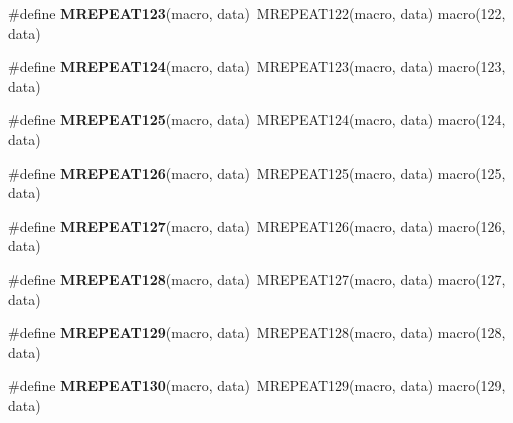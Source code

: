 \begin{DoxyCompactItemize}
\item 
\hypertarget{group__group__xmega__utils__mrepeat_gaf0802f3653fa2845f482ec6a119d9260}{\#define {\bfseries M\-R\-E\-P\-E\-A\-T123}(macro, data)~M\-R\-E\-P\-E\-A\-T122(macro, data)   macro(122, data)}\label{group__group__xmega__utils__mrepeat_gaf0802f3653fa2845f482ec6a119d9260}

\item 
\hypertarget{group__group__xmega__utils__mrepeat_gaffd8596b4b1da63e7fa64cdeb5c91dd0}{\#define {\bfseries M\-R\-E\-P\-E\-A\-T124}(macro, data)~M\-R\-E\-P\-E\-A\-T123(macro, data)   macro(123, data)}\label{group__group__xmega__utils__mrepeat_gaffd8596b4b1da63e7fa64cdeb5c91dd0}

\item 
\hypertarget{group__group__xmega__utils__mrepeat_ga7396c439515bd5514d070147e165690a}{\#define {\bfseries M\-R\-E\-P\-E\-A\-T125}(macro, data)~M\-R\-E\-P\-E\-A\-T124(macro, data)   macro(124, data)}\label{group__group__xmega__utils__mrepeat_ga7396c439515bd5514d070147e165690a}

\item 
\hypertarget{group__group__xmega__utils__mrepeat_ga53040b0cd4095d945f277af00a28a94d}{\#define {\bfseries M\-R\-E\-P\-E\-A\-T126}(macro, data)~M\-R\-E\-P\-E\-A\-T125(macro, data)   macro(125, data)}\label{group__group__xmega__utils__mrepeat_ga53040b0cd4095d945f277af00a28a94d}

\item 
\hypertarget{group__group__xmega__utils__mrepeat_gaebe40c87c802115261cb83ff47e7a2e6}{\#define {\bfseries M\-R\-E\-P\-E\-A\-T127}(macro, data)~M\-R\-E\-P\-E\-A\-T126(macro, data)   macro(126, data)}\label{group__group__xmega__utils__mrepeat_gaebe40c87c802115261cb83ff47e7a2e6}

\item 
\hypertarget{group__group__xmega__utils__mrepeat_ga932b04769d74272b98fbfe4d6c6e5f62}{\#define {\bfseries M\-R\-E\-P\-E\-A\-T128}(macro, data)~M\-R\-E\-P\-E\-A\-T127(macro, data)   macro(127, data)}\label{group__group__xmega__utils__mrepeat_ga932b04769d74272b98fbfe4d6c6e5f62}

\item 
\hypertarget{group__group__xmega__utils__mrepeat_ga7842d9600b24d29d82636afa3f0ca4b8}{\#define {\bfseries M\-R\-E\-P\-E\-A\-T129}(macro, data)~M\-R\-E\-P\-E\-A\-T128(macro, data)   macro(128, data)}\label{group__group__xmega__utils__mrepeat_ga7842d9600b24d29d82636afa3f0ca4b8}

\item 
\hypertarget{group__group__xmega__utils__mrepeat_ga4191567eafa92f00f44b2d84415d6364}{\#define {\bfseries M\-R\-E\-P\-E\-A\-T130}(macro, data)~M\-R\-E\-P\-E\-A\-T129(macro, data)   macro(129, data)}\label{group__group__xmega__utils__mrepeat_ga4191567eafa92f00f44b2d84415d6364}


\end{DoxyCompactItemize}
